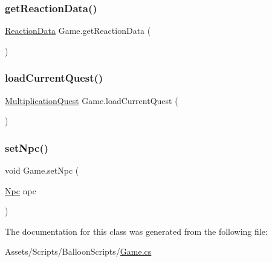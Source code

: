 \mbox{\label{classGame_ab42f098f8a14194c432bef59fc935e1d}} 
\subsubsection{\texorpdfstring{get\+Reaction\+Data()}{getReactionData()}}
{\footnotesize\ttfamily \hyperlink{classReactionData}{Reaction\+Data} Game.\+get\+Reaction\+Data (\begin{DoxyParamCaption}{ }\end{DoxyParamCaption})\hspace{0.3cm}{\ttfamily [inline]}}

\mbox{\label{classGame_a535c863103c355df501a523b378b19c4}} 
\subsubsection{\texorpdfstring{load\+Current\+Quest()}{loadCurrentQuest()}}
{\footnotesize\ttfamily \hyperlink{classMultiplicationQuest}{Multiplication\+Quest} Game.\+load\+Current\+Quest (\begin{DoxyParamCaption}{ }\end{DoxyParamCaption})\hspace{0.3cm}{\ttfamily [inline]}}

\mbox{\label{classGame_a95b602074c7accf633342d64fc572784}} 
\subsubsection{\texorpdfstring{set\+Npc()}{setNpc()}}
{\footnotesize\ttfamily void Game.\+set\+Npc (\begin{DoxyParamCaption}\item[{\hyperlink{classNpc}{Npc}}]{npc }\end{DoxyParamCaption})\hspace{0.3cm}{\ttfamily [inline]}}



The documentation for this class was generated from the following file\+:\begin{DoxyCompactItemize}
\item 
Assets/\+Scripts/\+Balloon\+Scripts/\hyperlink{Game_8cs}{Game.\+cs}\end{DoxyCompactItemize}
